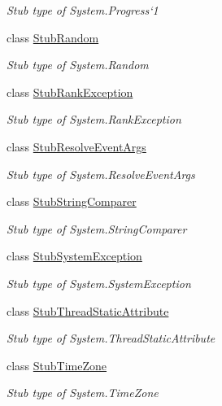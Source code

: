 \begin{DoxyCompactItemize}
\begin{DoxyCompactList}\small\item\em Stub type of System.\-Progress`1\end{DoxyCompactList}\item 
class \hyperlink{class_system_1_1_fakes_1_1_stub_random}{Stub\-Random}
\begin{DoxyCompactList}\small\item\em Stub type of System.\-Random\end{DoxyCompactList}\item 
class \hyperlink{class_system_1_1_fakes_1_1_stub_rank_exception}{Stub\-Rank\-Exception}
\begin{DoxyCompactList}\small\item\em Stub type of System.\-Rank\-Exception\end{DoxyCompactList}\item 
class \hyperlink{class_system_1_1_fakes_1_1_stub_resolve_event_args}{Stub\-Resolve\-Event\-Args}
\begin{DoxyCompactList}\small\item\em Stub type of System.\-Resolve\-Event\-Args\end{DoxyCompactList}\item 
class \hyperlink{class_system_1_1_fakes_1_1_stub_string_comparer}{Stub\-String\-Comparer}
\begin{DoxyCompactList}\small\item\em Stub type of System.\-String\-Comparer\end{DoxyCompactList}\item 
class \hyperlink{class_system_1_1_fakes_1_1_stub_system_exception}{Stub\-System\-Exception}
\begin{DoxyCompactList}\small\item\em Stub type of System.\-System\-Exception\end{DoxyCompactList}\item 
class \hyperlink{class_system_1_1_fakes_1_1_stub_thread_static_attribute}{Stub\-Thread\-Static\-Attribute}
\begin{DoxyCompactList}\small\item\em Stub type of System.\-Thread\-Static\-Attribute\end{DoxyCompactList}\item 
class \hyperlink{class_system_1_1_fakes_1_1_stub_time_zone}{Stub\-Time\-Zone}
\begin{DoxyCompactList}\small\item\em Stub type of System.\-Time\-Zone\end{DoxyCompactList}\item 

\end{DoxyCompactItemize}
